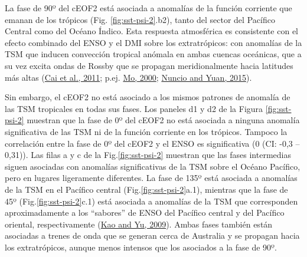 \documentclass[12pt,oneside,a4paper]{reedthesis}
\begin{document}
La fase de 90º del cEOF2 está asociada a anomalías de la función corriente que emanan de los trópicos (Fig. \ref{fig:sst-psi-2}.b2), tanto del sector del Pacífico Central como del Océano Índico.
Esta respuesta atmosférica es consistente con el efecto combinado del ENSO y el DMI sobre los extratrópicos: con anomalías de la TSM que inducen convección tropical anómala en ambas cuencas oceánicas, que a su vez excita ondas de Rossby que se propagan meridionalmente hacia latitudes más altas (\protect\hyperlink{ref-cai2011}{Cai et al., 2011}; p.ej. \protect\hyperlink{ref-mo2000}{Mo, 2000}; \protect\hyperlink{ref-nuncio2015}{Nuncio and Yuan, 2015}).

Sin embargo, el cEOF2 no está asociado a los mismos patrones de anomalía de las TSM tropicales en todas sus fases.
Los paneles d1 y d2 de la Figura \ref{fig:sst-psi-2} muestran que la fase de 0º del cEOF2 no está asociada a ninguna anomalía significativa de las TSM ni de la función corriente en los trópicos.
Tampoco la correlación entre la fase de 0º del cEOF2 y el ENSO es significativa (0 (CI: -0,3 -- 0,31)).
Las filas a y c de la Fig.\ref{fig:sst-psi-2} muestran que las fases intermedias siguen asociadas con anomalías significativas de la TSM sobre el Océano Pacífico, pero en lugares ligeramente diferentes.
La fase de 135º está asociada a anomalías de la TSM en el Pacífico central (Fig.\ref{fig:sst-psi-2}a.1), mientras que la fase de 45º (Fig.\ref{fig:sst-psi-2}c.1) está asociada a anomalías de la TSM que corresponden aproximadamente a los ``sabores'' de ENSO del Pacífico central y del Pacífico oriental, respectivamente (\protect\hyperlink{ref-kao2009}{Kao and Yu, 2009}).
Ambas fases también están asociadas a trenes de onda que se generan cerca de Australia y se propagan hacia los extratrópicos, aunque menos intensos que los asociados a la fase de 90º.
\end{document}
